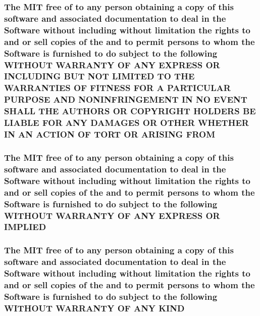 \subsubsection[{F\+R\+O\+M}]{\setlength{\rightskip}{0pt plus 5cm}The M\+I\+T free of to any person obtaining a {\bf copy} of this software and associated documentation to deal in the {\bf Software} without including without limitation the rights to and or sell copies of the and to permit persons to whom the {\bf Software} is furnished to do subject to the following W\+I\+T\+H\+O\+U\+T W\+A\+R\+R\+A\+N\+T\+Y O\+F A\+N\+Y E\+X\+P\+R\+E\+S\+S O\+R I\+N\+C\+L\+U\+D\+I\+N\+G B\+U\+T N\+O\+T L\+I\+M\+I\+T\+E\+D T\+O T\+H\+E W\+A\+R\+R\+A\+N\+T\+I\+E\+S O\+F F\+I\+T\+N\+E\+S\+S F\+O\+R A P\+A\+R\+T\+I\+C\+U\+L\+A\+R P\+U\+R\+P\+O\+S\+E A\+N\+D N\+O\+N\+I\+N\+F\+R\+I\+N\+G\+E\+M\+E\+N\+T I\+N N\+O E\+V\+E\+N\+T S\+H\+A\+L\+L T\+H\+E A\+U\+T\+H\+O\+R\+S O\+R C\+O\+P\+Y\+R\+I\+G\+H\+T H\+O\+L\+D\+E\+R\+S B\+E L\+I\+A\+B\+L\+E F\+O\+R A\+N\+Y D\+A\+M\+A\+G\+E\+S O\+R O\+T\+H\+E\+R W\+H\+E\+T\+H\+E\+R I\+N A\+N A\+C\+T\+I\+O\+N O\+F T\+O\+R\+T O\+R A\+R\+I\+S\+I\+N\+G F\+R\+O\+M}\label{license_8txt_ac44d0f7742875ad0d1fc3a6de1ee0f7d}
\hypertarget{license_8txt_ab0624cdd79a1b72ae3e8cb7b147149da}{}
\subsubsection[{I\+M\+P\+L\+I\+E\+D}]{\setlength{\rightskip}{0pt plus 5cm}The M\+I\+T free of to any person obtaining a {\bf copy} of this software and associated documentation to deal in the {\bf Software} without including without limitation the rights to and or sell copies of the and to permit persons to whom the {\bf Software} is furnished to do subject to the following W\+I\+T\+H\+O\+U\+T W\+A\+R\+R\+A\+N\+T\+Y O\+F A\+N\+Y E\+X\+P\+R\+E\+S\+S O\+R I\+M\+P\+L\+I\+E\+D}\label{license_8txt_ab0624cdd79a1b72ae3e8cb7b147149da}
\hypertarget{license_8txt_a8e1a82be600178fe97c0e1339897c260}{}
\subsubsection[{K\+I\+N\+D}]{\setlength{\rightskip}{0pt plus 5cm}The M\+I\+T free of to any person obtaining a {\bf copy} of this software and associated documentation to deal in the {\bf Software} without including without limitation the rights to and or sell copies of the and to permit persons to whom the {\bf Software} is furnished to do subject to the following W\+I\+T\+H\+O\+U\+T W\+A\+R\+R\+A\+N\+T\+Y O\+F A\+N\+Y K\+I\+N\+D}\label{license_8txt_a8e1a82be600178fe97c0e1339897c260}
\hypertarget{license_8txt_a154c0f6f925190567752588d1ff5458f}{}
